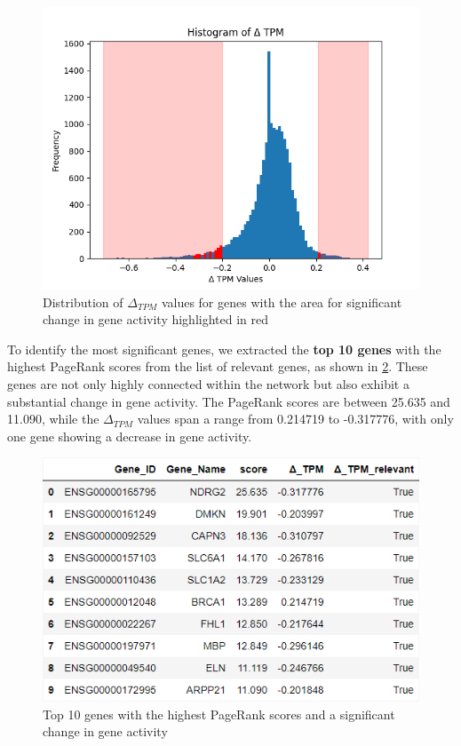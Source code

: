\begin{figure}[!h]
    \centering
    \includegraphics[height=\dfheightdouble]{figures/04_delta_tpm_relevant}
    \caption{Distribution of $\Delta_{TPM}$ values for genes with the area for significant change in gene activity highlighted in red}
    \label{fig:04_delta_tpm_relevant}
\end{figure}


To identify the most significant genes, we extracted the \textbf{top 10 genes} with the highest PageRank scores from the list of relevant genes,
as shown in \cref{fig:03_03_df_pagerank_relevant}.
These genes are not only highly connected within the network but also exhibit a substantial change in gene activity.
The PageRank scores are between 25.635 and 11.090,
while the $\Delta_{TPM}$ values span a range from 0.214719 to -0.317776, with only one gene showing a decrease in gene activity.\\


\begin{figure}[!h]
    \centering
    \includegraphics[height=\dfheightdouble]{figures/03_03_df_pagerank_relevant}
    \caption{Top 10 genes with the highest PageRank scores and a significant change in gene activity}
    \label{fig:03_03_df_pagerank_relevant}
\end{figure}

